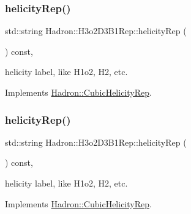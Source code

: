 \mbox{\label{structHadron_1_1H3o2D3B1Rep_a7d01a3bd011469f3f901f6bbaeaa0394}} 
\subsubsection{\texorpdfstring{helicityRep()}{helicityRep()}\hspace{0.1cm}{\footnotesize\ttfamily [1/2]}}
{\footnotesize\ttfamily std\+::string Hadron\+::\+H3o2\+D3\+B1\+Rep\+::helicity\+Rep (\begin{DoxyParamCaption}{ }\end{DoxyParamCaption}) const\hspace{0.3cm}{\ttfamily [inline]}, {\ttfamily [virtual]}}

helicity label, like H1o2, H2, etc. 

Implements \mbox{\hyperlink{structHadron_1_1CubicHelicityRep_af1096946b7470edf0a55451cc662f231}{Hadron\+::\+Cubic\+Helicity\+Rep}}.

\mbox{\label{structHadron_1_1H3o2D3B1Rep_a7d01a3bd011469f3f901f6bbaeaa0394}} 
\subsubsection{\texorpdfstring{helicityRep()}{helicityRep()}\hspace{0.1cm}{\footnotesize\ttfamily [2/2]}}
{\footnotesize\ttfamily std\+::string Hadron\+::\+H3o2\+D3\+B1\+Rep\+::helicity\+Rep (\begin{DoxyParamCaption}{ }\end{DoxyParamCaption}) const\hspace{0.3cm}{\ttfamily [inline]}, {\ttfamily [virtual]}}

helicity label, like H1o2, H2, etc. 

Implements \mbox{\hyperlink{structHadron_1_1CubicHelicityRep_af1096946b7470edf0a55451cc662f231}{Hadron\+::\+Cubic\+Helicity\+Rep}}.

\mbox{\label{structHadron_1_1H3o2D3B1Rep_acf8f745ca578c355ecbb4097e8c0ce39}} 
